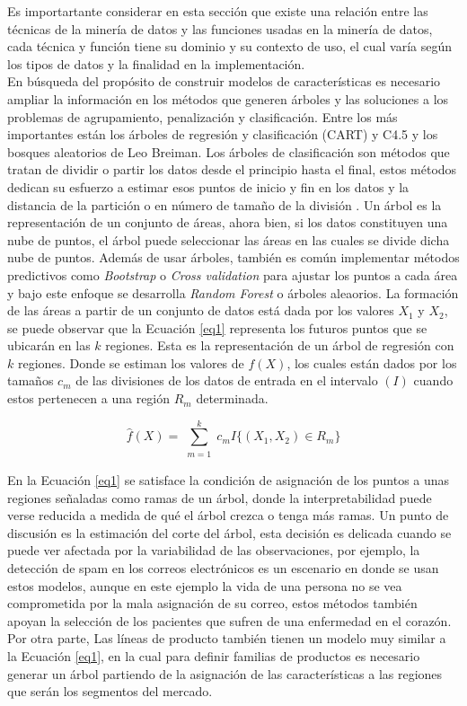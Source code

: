 Es importartante considerar en esta sección que existe una relación entre las técnicas de la minería de datos y las funciones usadas en la minería de datos, cada técnica y función tiene su dominio y su contexto de uso, el cual varía según los tipos de datos y la finalidad en la implementación\cite{Harding2006}. \\
En búsqueda del propósito de construir modelos de características es necesario ampliar la información en los métodos que generen árboles y las soluciones a los problemas de agrupamiento, penalización y clasificación. Entre los más importantes están los árboles de regresión y clasificación (CART) y C4.5 y los bosques aleatorios de Leo Breiman. Los árboles de clasificación son métodos que tratan de dividir o partir los datos desde el principio hasta el final, estos métodos dedican su esfuerzo a estimar esos puntos de inicio y fin en los datos y la distancia de la partición o en número de tamaño de la división \cite{Izenman2006, Hastie2009}.
Un árbol es la representación de un conjunto de áreas, ahora bien, si los datos constituyen una nube de puntos, el árbol puede seleccionar las áreas en las cuales se divide dicha nube de puntos. Además de usar árboles, también es común implementar métodos predictivos como \textit{Bootstrap} o \textit{Cross validation} para ajustar los puntos a cada área y bajo este enfoque se desarrolla \textit{Random Forest} o árboles aleaorios\cite{Izenman2006, Hastie2009}.
La formación de las áreas a partir de un conjunto de datos está dada por los valores $X_{1}$ y $X_{2}$, se puede observar que la Ecuación \ref{eq1} representa los futuros puntos que se ubicarán en las $k$ regiones\cite{Izenman2006}. Esta es la representación de un árbol de regresión con $k$ regiones. Donde se estiman los valores de $f(X)$, los cuales están dados por los tamaños $c_{m}$ de las divisiones de los datos de entrada en el intervalo $(I)$ cuando estos pertenecen a una región $R_{m}$ determinada.

    \begin{equation}
    \hat{f}(X)=\sum_{\substack{m=1}}^kc_{m}I\{(X_{1},X_{2})\in R_{m}\}
    \label{eq1}
    \end{equation}

En la Ecuación \ref{eq1} se satisface la condición de asignación de los puntos a unas regiones señaladas como ramas de un árbol, donde la interpretabilidad puede verse reducida a medida de qué el árbol crezca o tenga más ramas. Un punto de discusión es la estimación del corte del árbol, esta decisión es delicada cuando se puede ver afectada por la variabilidad de las observaciones\cite{Izenman2006}, por ejemplo, la detección de spam en los correos electrónicos es un escenario en donde se usan estos modelos, aunque en este ejemplo la vida de una persona no se vea comprometida por la mala asignación de su correo, estos métodos también apoyan la selección de los pacientes que sufren de una enfermedad en el corazón\cite{Izenman2006}. Por otra parte, Las líneas de producto también tienen un modelo muy similar a la Ecuación \ref{eq1}, en la cual para definir familias de productos es necesario generar un árbol partiendo de la asignación de las características a las regiones que serán los segmentos del mercado.

